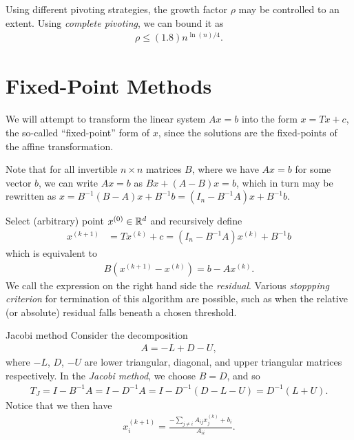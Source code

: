 \begin{rmk}
    Using different pivoting strategies, the growth factor $\rho$ may be controlled to an extent. Using \emph{complete pivoting}, we can bound it as
    \begin{align*}
        \rho \leq (1.8)n^{\ln(n)/4}.
    \end{align*}
\end{rmk}

\section{Fixed-Point Methods}

We will attempt to transform the linear system $Ax = b$ into the form $x = Tx + c$, the so-called ``fixed-point'' form of $x$, since the solutions are the fixed-points of the affine transformation.

Note that for all invertible $n \times n$ matrices $B$, where we have $Ax = b$ for some vector $b$, we can write $Ax = b$ as $Bx + (A - B)x = b$, which in turn may be rewritten as $x = B^{-1}(B-A)x + B^{-1}b = (I_n - B^{-1}A)x + B^{-1}b$.

\begin{defn}
    Select (arbitrary) point $x^{(0)} \in \mathbb{R}^{d}$ and recursively define
    \begin{align*}
        x^{(k+1)} &= Tx^{(k)} + c = \left(I_n - B^{-1}A\right)x^{(k)} + B^{-1}b
    \end{align*}
    which is equivalent to
    \begin{align*}
        B\left(x^{(k+1)} - x^{(k)}\right) = b - Ax^{(k)}.
    \end{align*}
    We call the expression on the right hand side the \emph{residual}. Various \emph{stoppping criterion} for termination of this algorithm are possible, such as when the relative (or absolute) residual falls beneath a chosen threshold.
\end{defn}

\begin{defn}{Jacobi method}\proofbreak
    Consider the decomposition
    \begin{align*}
        A = -L + D - U,
    \end{align*}
    where $-L$, $D$, $-U$ are lower triangular, diagonal, and upper triangular matrices respectively. In the \emph{Jacobi method}, we choose $B = D$, and so
    \begin{align*}
        T_{J} = I - B^{-1}A = I - D^{-1}A = I-D^{-1}(D - L - U) = D^{-1}(L + U).
    \end{align*}
    Notice that we then have
    \begin{align*}
        x^{(k + 1)}_{i} = \frac{-\sum_{j\neq i}A_{ij}x^{(k)}_j + b_i}{A_{ii}}.
    \end{align*}
\end{defn}

